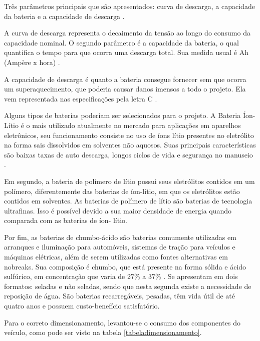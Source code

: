 \begin{itemize}
    Três parâmetros principais que são apresentados: curva de descarga, a capacidade da bateria e a capacidade de
    descarga \cite{MEGGLIAR}.

    A curva de descarga representa o decaimento da tensão ao longo do consumo da capacidade nominal. O segundo parâmetro
    é a capacidade da bateria, o qual quantifica o tempo para que ocorra uma descarga total. Sua medida usual é Ah
    (Ampère x hora) \cite{MEGGLIAR}.

    A capacidade de descarga é quanto a bateria consegue fornecer sem que ocorra um superaquecimento, que poderia
    causar danos imensos a todo o projeto. Ela vem representada nas especificações pela letra C \cite{MEGGLIAR}.

    Alguns tipos de baterias poderiam ser selecionados para o projeto. A Bateria Íon- Lítio é o mais utilizado atualmente
    no mercado para aplicações em aparelhos eletrônicos, seu funcionamento consiste no uso de íons lítio presentes no
    eletrólito na forma sais dissolvidos em solventes não aquosos. Suas principais características são baixas taxas de auto
    descarga, longos ciclos de vida e segurança no manuseio \cite{castillo2002advances}.

    Em segundo, a bateria de polímero de lítio possui seus eletrólitos contidos em um polímero, diferentemente das baterias
    de íon-lítio, em que os eletrólitos estão contidos em solventes. As baterias de polímero de lítio são baterias de tecnologia
    ultrafinas. Isso é possível devido a sua maior densidade de energia quando comparada com as baterias de íon- lítio.

    Por fim, as baterias de chumbo-ácido são baterias comumente utilizadas em arranques e iluminação para automóveis,
    sistemas de tração para veículos e máquinas elétricas, além de serem utilizadas como fontes alternativas em nobreaks.
    Sua composição é chumbo, que está presente na forma sólida e ácido sulfúrico, em concentração que varia de 27\% a 37\%
    \cite{pulsada2005juliano}. Se apresentam em dois formatos: seladas e não seladas, sendo que nesta segunda existe a necessidade de
    reposição de água. São baterias recarregáveis, pesadas, têm vida útil de até quatro anos e possuem custo-benefício satisfatório.

    Para o correto dimensionamento, levantou-se o consumo dos componentes do veículo, como pode ser visto na tabela \ref{tabeladimensionamento}.


\end{itemize}
